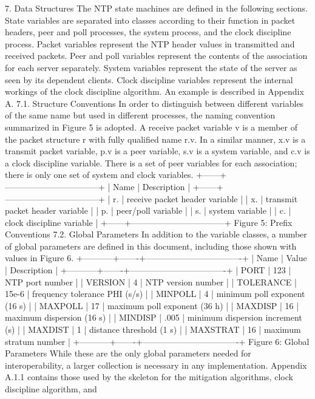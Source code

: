 7. Data Structures
 The NTP state machines are defined in the following sections. State
 variables are separated into classes according to their function in
 packet headers, peer and poll processes, the system process, and the
 clock discipline process. Packet variables represent the NTP header
 values in transmitted and received packets. Peer and poll variables
 represent the contents of the association for each server separately.
 System variables represent the state of the server as seen by its
 dependent clients. Clock discipline variables represent the internal
 workings of the clock discipline algorithm. An example is described
 in Appendix A.
7.1. Structure Conventions
 In order to distinguish between different variables of the same name
 but used in different processes, the naming convention summarized in
 Figure 5 is adopted. A receive packet variable v is a member of the
 packet structure r with fully qualified name r.v. In a similar
 manner, x.v is a transmit packet variable, p.v is a peer variable,
 s.v is a system variable, and c.v is a clock discipline variable.
 There is a set of peer variables for each association; there is only
 one set of system and clock variables.
 +------+---------------------------------+
 | Name | Description |
 +------+---------------------------------+
 | r. | receive packet header variable |
 | x. | transmit packet header variable |
 | p. | peer/poll variable |
 | s. | system variable |
 | c. | clock discipline variable |
 +------+---------------------------------+
 Figure 5: Prefix Conventions
7.2. Global Parameters
 In addition to the variable classes, a number of global parameters
 are defined in this document, including those shown with values in
 Figure 6.
 +-----------+-------+----------------------------------+
 | Name | Value | Description |
 +-----------+-------+----------------------------------+
 | PORT | 123 | NTP port number |
 | VERSION | 4 | NTP version number |
 | TOLERANCE | 15e-6 | frequency tolerance PHI (s/s) |
 | MINPOLL | 4 | minimum poll exponent (16 s) |
 | MAXPOLL | 17 | maximum poll exponent (36 h) |
 | MAXDISP | 16 | maximum dispersion (16 s) |
 | MINDISP | .005 | minimum dispersion increment (s) |
 | MAXDIST | 1 | distance threshold (1 s) |
 | MAXSTRAT | 16 | maximum stratum number |
 +-----------+-------+----------------------------------+
 Figure 6: Global Parameters
 While these are the only global parameters needed for
 interoperability, a larger collection is necessary in any
 implementation. Appendix A.1.1 contains those used by the skeleton
 for the mitigation algorithms, clock discipline algorithm, and

